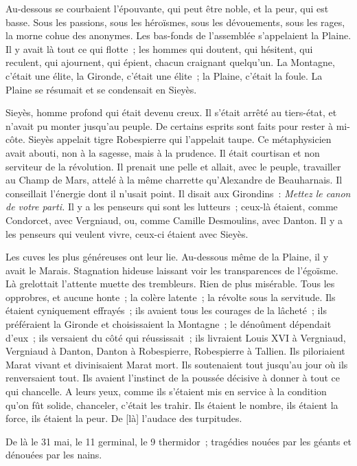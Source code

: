 \documentclass[french,twoside]{book} %
\newcommand\corr[1]{#1}
\def\mednobreak{\ifdim\lastskip<\medskipamount
  \removelastskip\nopagebreak\medskip\fi}
\newcommand{\labelblock}[1]{\medbreak{\noindent\color{rubric}\bfseries #1}\par\mednobreak}
\begin{document}
\labelblock{v}

\noindent Au-dessous se courbaient l’épouvante, qui peut être noble, et la peur, qui est basse. Sous les passions, sous les héroïsmes, sous les dévouements, sous les rages, la morne cohue des anonymes. Les bas-fonds de l’assemblée s’appelaient la Plaine. Il y avait là tout ce qui flotte ; les hommes qui doutent, qui hésitent, qui reculent, qui ajournent, qui épient, chacun craignant quelqu’un. La Montagne, c’était une élite, la Gironde, c’était une élite ; la Plaine, c’était la foule. La Plaine se résumait et se condensait en Sieyès.\par
Sieyès, homme profond qui était devenu creux. Il s’était arrêté au tiers-état, et n’avait pu monter jusqu’au  peuple. De certains esprits sont faits pour rester à mi-côte. Sieyès appelait tigre Robespierre qui l’appelait taupe. Ce métaphysicien avait abouti, non à la sagesse, mais à la prudence. Il était courtisan et non serviteur de la révolution. Il prenait une pelle et allait, avec le peuple, travailler au Champ de Mars, attelé à la même charrette qu’Alexandre de Beauharnais. Il conseillait l’énergie dont il n’usait point. Il disait aux Girondins : \emph{Mettez le canon de votre parti.} Il y a les penseurs qui sont les lutteurs ; ceux-là étaient, comme Condorcet, avec Vergniaud, ou, comme Camille Desmoulins, avec Danton. Il y a les penseurs qui veulent vivre, ceux-ci étaient avec Sieyès.\par
Les cuves les plus généreuses ont leur lie. Au-dessous même de la Plaine, il y avait le Marais. Stagnation hideuse laissant voir les transparences de l’égoïsme. Là grelottait l’attente muette des trembleurs. Rien de plus misérable. Tous les opprobres, et aucune honte ; la colère latente ; la révolte sous la servitude. Ils étaient cyniquement effrayés ; ils avaient tous les courages de la lâcheté ; ils préféraient la Gironde et choisissaient la Montagne ; le dénoûment dépendait d’eux ; ils versaient du côté qui réussissait ; ils livraient Louis XVI à Vergniaud, Vergniaud à Danton, Danton à Robespierre, Robespierre à Tallien. Ils piloriaient Marat vivant et divinisaient Marat mort. Ils soutenaient tout jusqu’au jour où ils renversaient tout. Ils avaient l’instinct de la poussée décisive à donner à tout ce qui chancelle. A leurs yeux, comme ils s’étaient mis en service à la condition qu’on fût  solide, chanceler, c’était les trahir. Ils étaient le nombre, ils étaient la force, ils étaient la peur. De [{\corr là}] l’audace des turpitudes.\par
De là le 31 mai, le 11 germinal, le 9 thermidor ; tragédies nouées par les géants et dénouées par les nains.\par
\end{document}
